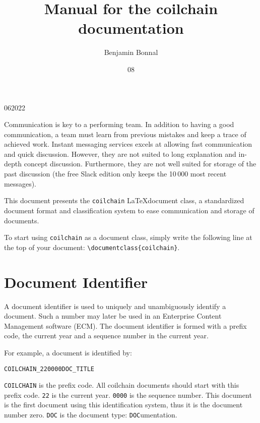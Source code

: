 \documentclass[technicalreport]{coilchain}
\begin{document}

\title{Manual for the coilchain documentation}

\author{Benjamin Bonnal}

\date{08}{06}{2022}


\maketitle
	
	\begin{introduction}
Communication is key to a performing team. In  addition to having a good 
communication, a team must learn from previous mistakes and keep a trace of 
achieved work. Instant messaging services excels at allowing fast communication 
and quick discussion. However, they are not suited to long explanation and 
in-depth concept discussion. Furthermore, they are not well suited for storage 
of the past discussion (the free Slack edition only keeps the 10\,000 most 
recent messages).

This document presents the \texttt{coilchain} \LaTeX document class, a 
standardized document format and classification system to ease communication 
and storage of documents.

To start using \verb|coilchain| as a document class, simply write the 
following line at the top of your document: \verb|\documentclass{coilchain}|.
	\end{introduction}
	
	\tableofcontents
	
	\section{Document Identifier}
A document identifier is used to uniquely and unambiguously identify a 
document. Such a number may later be used in an Enterprise Content Management 
software (ECM). The document identifier is formed with a prefix code, the 
current year and a sequence number in the current year.

For example, a document is identified by:

\begin{center}
	\texttt{COILCHAIN\_220000DOC\_TITLE}
\end{center}

\texttt{COILCHAIN} is the prefix code. All coilchain documents should start with 
this prefix code. \texttt{22} is the current year. \texttt{0000} is the 
sequence number. This document is the first document using this identification 
system, thus it is the document number zero. \texttt{DOC} is the document type: 
\texttt{DOC}umentation.
\end{document}
